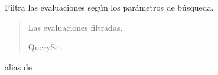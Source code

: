 \documentclass[letterpaper,10pt,spanish]{sphinxmanual}
\begin{document}
\begin{fulllineitems}
\begin{fulllineitems}
\pysigstartsignatures
{}
\pysigstopsignatures
\sphinxAtStartPar
Filtra las evaluaciones según los parámetros de búsqueda.
\begin{quote}\begin{description}
\sphinxAtStartPar
Las evaluaciones filtradas.

\sphinxAtStartPar
QuerySet

\end{description}\end{quote}

\end{fulllineitems}



\begin{fulllineitems}

\pysigstartsignatures
{}
\pysigstopsignatures
\sphinxAtStartPar
alias de 

\end{fulllineitems}



\begin{fulllineitems}

\pysigstartsignatures
{}
\pysigstopsignatures
\end{fulllineitems}


\end{fulllineitems}
\end{document}
